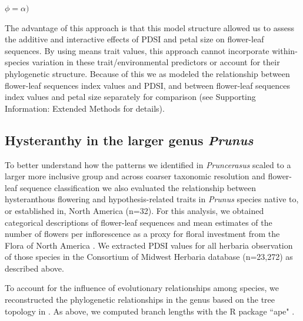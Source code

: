\documentclass{article}[12pt]
\begin{document}
$\phi = \alpha)$


The advantage of this approach is that this model structure allowed us to assess the additive and interactive effects of PDSI and petal size on flower-leaf sequences. By using means trait values, this approach cannot incorporate within-species variation in these trait/environmental predictors or account for their phylogenetic structure. Because of this we as modeled the relationship between flower-leaf sequences index values and PDSI, and between flower-leaf sequences index values and petal size separately for comparison (see Supporting Information: Extended Methods for details). 
  
  
\subsection*{Hysteranthy in the larger genus \textit{Prunus}}

To better understand how the patterns we identified in \textit{Pruncerasus} scaled to a larger more inclusive group and across coarser taxonomic resolution and flower-leaf sequence classification we also evaluated the relationship between hysteranthous flowering and hypothesis-related traits in \textit{Prunus} species native to, or established in, North America (n=32). For this analysis, we obtained categorical descriptions of flower-leaf sequences and mean estimates of the number of flowers per inflorescence as a proxy for floral investment from the Flora of North America \citep{Rohrer_1993}.  We extracted PDSI values for all herbaria observation of those species in the Consortium of Midwest Herbaria database (n=23,272) as described above.

 
To account for the influence of evolutionary relationships among species, we reconstructed the phylogenetic relationships in the genus based on the tree topology in \citet{Chin:2014wu}. As above, we computed branch lengths with the R package ``ape" \citep{Paradis2019}. 
\end{document}
